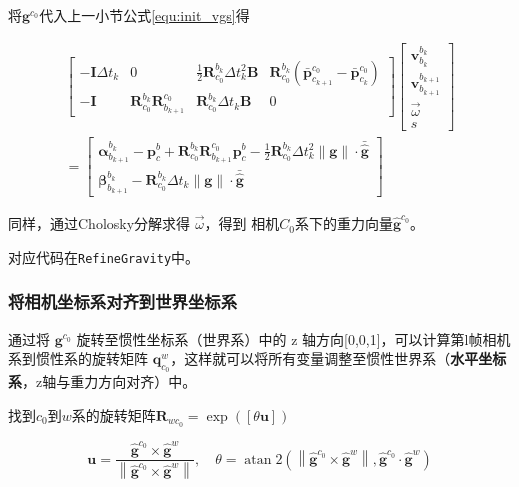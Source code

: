 \documentclass[12pt,a4paper]{article}
\begin{document}
将$\mathbf{g}^{c_0}$代入上一小节公式\eqref{equ:init_vgs}得

\begin{equation}
\begin{aligned}
\begin{bmatrix}
-\mathbf{I} \Delta t_{k} & 0 & \frac{1}{2} \mathbf{R}^{b_{k}}_{c_{0}} \Delta t_{k}^{2} \mathbf{B} &
\mathbf{R}^{b_{k}}_{c_{0}} (\bar{\mathbf{p}}^{c_{0}}_{c_{k+1}} - \bar{\mathbf{p}}^{c_{0}}_{c_{k}}) \\
-\mathbf{I} & \mathbf{R}^{b_{k}}_{c_{0}} \mathbf{R}^{c_0}_{b_{k+1}} & \mathbf{R}^{b_{k}}_{c_{0}}\Delta t_{k} \mathbf{B} & 0
\end{bmatrix}
\begin{bmatrix}
\mathbf{v}^{b_{k}}_{b_{k}} \\
\mathbf{v}^{b_{k+1}}_{b_{k+1}} \\
\vec{\omega} \\
s
\end{bmatrix} 
\\=
\begin{bmatrix}
\boldsymbol{\alpha}^{b_{k}}_{b_{k+1}} - \mathbf{p}_c^b + \mathbf{R}^{b_{k}}_{c_{0}} \mathbf{R}^{c_0}_{b_{k+1}} \mathbf{p}_c^b -
\frac{1}{2} \mathbf{R}^{b_{k}}_{c_{0}} \Delta t_{k}^{2} \|\mathbf{g}\| \cdot \bar{\hat{\mathbf{g}}}\\
\boldsymbol{\beta}^{b_{k}}_{b_{k+1}} -
\mathbf{R}^{b_{k}}_{c_{0}} \Delta t_{k} \|\mathbf{g}\| \cdot \bar{\hat{\mathbf{g}}}
\end{bmatrix}
\end{aligned}
\end{equation}

同样，通过Cholosky分解求得 $\vec{\omega}$，得到 相机$C_0$系下的重力向量$\hat{\mathbf{g}}^{c_0}$。

对应代码在\verb|RefineGravity|中。

\subsubsection{将相机坐标系对齐到世界坐标系}

通过将 $\mathbf{g}^{c_{0}}$ 旋转至惯性坐标系（世界系）中的 z 轴方向[0,0,1]，可以计算第l帧相机系到惯性系的旋转矩阵 $\mathbf{q}_{c_0}^w$，这样就可以将所有变量调整至惯性世界系（\textbf{水平坐标系}，z轴与重力方向对齐）中。

找到$c_0$到$w$系的旋转矩阵$\mathbf{R}_{w c_{0}}=\exp ([\theta \mathbf{u}])$

\begin{equation}
\mathbf{u}
=
\frac{\hat{\mathbf{g}}^{c_{0}} \times \hat{\mathbf{g}}^{w}}{\left\|\hat{\mathbf{g}}^{c_{0}} \times \hat{\mathbf{g}}^{w}\right\|}, \quad 
\theta
=
\operatorname{atan} 2\left(\left\|\hat{\mathbf{g}}^{c_{0}} \times \hat{\mathbf{g}}^{w}\right\|, \hat{\mathbf{g}}^{c_{0}} \cdot \hat{\mathbf{g}}^{w}\right)
\end{equation}
\end{document}
